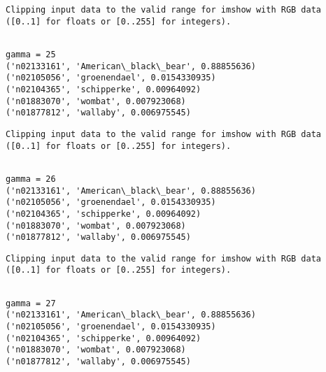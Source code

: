 \documentclass[11pt]{article}
\begin{document}
    \begin{Verbatim}[commandchars=\\\{\}]
Clipping input data to the valid range for imshow with RGB data ([0..1] for floats or [0..255] for integers).

    \end{Verbatim}

    \begin{Verbatim}[commandchars=\\\{\}]

gamma = 25
('n02133161', 'American\_black\_bear', 0.88855636)
('n02105056', 'groenendael', 0.0154330935)
('n02104365', 'schipperke', 0.00964092)
('n01883070', 'wombat', 0.007923068)
('n01877812', 'wallaby', 0.006975545)

    \end{Verbatim}

    \begin{Verbatim}[commandchars=\\\{\}]
Clipping input data to the valid range for imshow with RGB data ([0..1] for floats or [0..255] for integers).

    \end{Verbatim}

    \begin{Verbatim}[commandchars=\\\{\}]

gamma = 26
('n02133161', 'American\_black\_bear', 0.88855636)
('n02105056', 'groenendael', 0.0154330935)
('n02104365', 'schipperke', 0.00964092)
('n01883070', 'wombat', 0.007923068)
('n01877812', 'wallaby', 0.006975545)

    \end{Verbatim}

    \begin{Verbatim}[commandchars=\\\{\}]
Clipping input data to the valid range for imshow with RGB data ([0..1] for floats or [0..255] for integers).

    \end{Verbatim}

    \begin{Verbatim}[commandchars=\\\{\}]

gamma = 27
('n02133161', 'American\_black\_bear', 0.88855636)
('n02105056', 'groenendael', 0.0154330935)
('n02104365', 'schipperke', 0.00964092)
('n01883070', 'wombat', 0.007923068)
('n01877812', 'wallaby', 0.006975545)

    \end{Verbatim}
\end{document}
